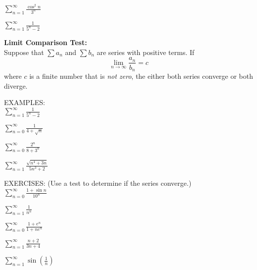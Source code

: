 \documentclass[11pt]{article}
\begin{document}
\vspace{1.5in}

$\sum_{n=1}^{\infty} \frac{\cos^2{n}}{3^n} $


\pagebreak

$\sum_{n=1}^{\infty} \frac{1}{5^n - 2} $

\vspace{1.5in}

{\bf Limit Comparison Test:}  \\

Suppose that $\sum a_n$ and $\sum b_n$ are series with positive terms. If
\begin{displaymath}
\lim_{n\to \infty}\frac{a_n}{b_n} = c
  \end{displaymath}
where $c$ is a finite number that is \emph{not zero}, the either both series converge or both diverge.

\vspace{0.25in}

EXAMPLES:\\

$\sum_{n=1}^{\infty} \frac{1}{5^n - 2} $

\vspace{1.5in}

$\sum_{n=0}^{\infty} \frac{1}{4 + \sqrt{n}} $

\vspace{1.5in}

$\sum_{n=0}^{\infty} \frac{2^n}{8 + 3^n} $

\vspace{1.5in}

$\sum_{n=1}^{\infty} \frac{\sqrt{n^4+ 3n}}{5n^3+2} $

\vspace{1.5in}

EXERCISES: (Use a test to determine if the series converge.) \\

$\sum_{n=0}^{\infty} \frac{1+ \sin{n}}{10^n} $

\vspace{1in}

$\sum_{n=1}^{\infty} \frac{1}{n^n} $

\vspace{1in}

$\sum_{n=0}^{\infty} \frac{1+ e^n}{1 + ne^n} $

\vspace{1in}

$\sum_{n=1}^{\infty} \frac{n+2}{3n+4} $

\vspace{1in}

$\sum_{n=1}^{\infty} \sin{\left(\frac1n\right)}$
\end{document}
